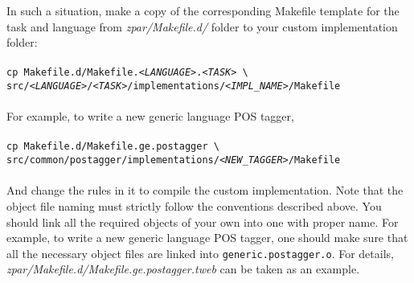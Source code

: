 \documentclass[12pt]{article}
\begin{document}
\begin{CJK}{GBK}{song}
In such a situation, make a copy of the corresponding Makefile template
for the task and language 
from \textit{zpar/Makefile.d/} folder
to your custom implementation folder:
\\
\\
\hspace{3cm}\texttt{cp Makefile.d/Makefile.\textit{<LANGUAGE>}.\textit{<TASK>} \textbackslash \\
\hspace{3cm}\quad src/\textit{<LANGUAGE>}/\textit{<TASK>}/implementations/\textit{<IMPL\_NAME>}/Makefile}
\\
\\
For example, to write a new generic language POS tagger,
\\
\\
\hspace{3cm}\texttt{cp Makefile.d/Makefile.ge.postagger \textbackslash \\
\hspace{3cm}\quad src/common/postagger/implementations/\textit{<NEW\_TAGGER>}/Makefile}
\\
\\
And change the rules in it to compile the custom implementation.
Note that the object file naming must strictly follow
the conventions described above.
You should link all the required objects of your own into one with proper name.
For example, to write a new generic language POS tagger,
one should make sure that
all the necessary object files
are linked into \texttt{generic.postagger.o}.
For details, \textit{zpar/Makefile.d/Makefile.ge.postagger.tweb} can be taken as an example.

\end{CJK}
\end{document}
